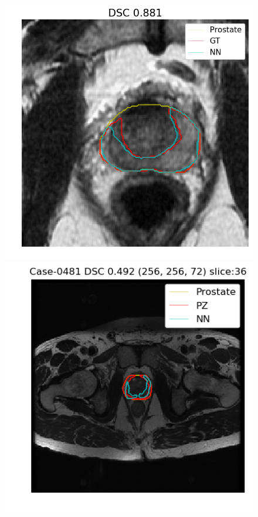 \begin{figure}[h]
    \includegraphics[totalheight=.2\textheight]{figures/results/PZ_GE__GE_yes_ROI_MAX_Case-0508.png}
    \vspace{10mm}
    \includegraphics[totalheight=.2\textheight]{figures/results/PZ_GE__GE_yes_Original_MIN_Case-0481.png}

\end{figure}
